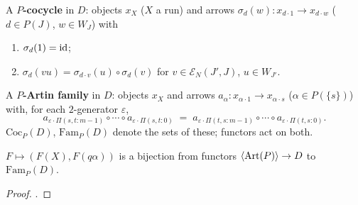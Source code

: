 \documentclass[11pt]{article}
\newcommand{\EN}{\mathcal{E}_N}
\newcommand{\Coc}{\mathrm{Coc}}
\newcommand{\Fam}{\mathrm{Fam}}
\newcommand{\altw}[3]{\Pi(#1,#2:#3)}
\begin{document}
\begin{definition}\label{def:cocycle}
  A \textbf{$P$-cocycle} in $D$: objects $x_X$ ($X$ a run) and arrows $\sigma_d(w) : x_{d\cdot1} \to
  x_{d\cdot w}$ ($d \in P(J)$, $w \in W_J$) with
  \begin{enumerate}[label=(C\arabic*)]
    \item $\sigma_d(1) = \operatorname{id}$;
    \item $\sigma_d(vu) = \sigma_{d\cdot v}(u) \circ \sigma_d(v)$ for $v \in \EN(J',J)$, $u \in
      W_{J'}$.
  \end{enumerate}
  A \textbf{$P$-Artin family} in $D$: objects $x_X$ and arrows $a_\alpha : x_{\alpha\cdot1} \to
  x_{\alpha\cdot s}$ ($\alpha \in P(\{s\})$) with, for each $2$-generator $\varepsilon$,
  \[
    a_{\varepsilon\cdot\altw st{m-1}} \circ \cdots \circ a_{\varepsilon\cdot\altw st0}
    \;=\;
    a_{\varepsilon\cdot\altw ts{m-1}} \circ \cdots \circ a_{\varepsilon\cdot\altw ts0} .
  \]
  $\Coc_P(D)$, $\Fam_P(D)$ denote the sets of these; functors act on both.
\end{definition}

\begin{proposition}\label{prop:pres}
  $F \mapsto (F(X), F(q\alpha))$ is a bijection from functors $\left\langle \operatorname{Art}(P) \right\rangle \to D$ to $\Fam_P(D)$.
\end{proposition}
\begin{proof}
  \cite[Lem.~2.1.3, Lem.~2.3.4]{Polygraphs}.
\end{proof}
\end{document}
